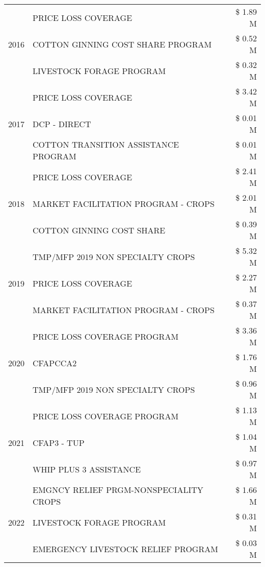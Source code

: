 \begin{tabular}{llr}
\cline{1-3}
\multirow[t]{3}{*}{2016} & PRICE LOSS COVERAGE & \$ 1.89 M \\
 & COTTON GINNING COST SHARE PROGRAM & \$ 0.52 M \\
 & LIVESTOCK FORAGE PROGRAM & \$ 0.32 M \\
\cline{1-3}
\multirow[t]{3}{*}{2017} & PRICE LOSS COVERAGE & \$ 3.42 M \\
 & DCP - DIRECT & \$ 0.01 M \\
 & COTTON TRANSITION ASSISTANCE PROGRAM & \$ 0.01 M \\
\cline{1-3}
\multirow[t]{3}{*}{2018} & PRICE LOSS COVERAGE & \$ 2.41 M \\
 & MARKET FACILITATION PROGRAM - CROPS & \$ 2.01 M \\
 & COTTON GINNING COST SHARE & \$ 0.39 M \\
\cline{1-3}
\multirow[t]{3}{*}{2019} & TMP/MFP 2019 NON SPECIALTY CROPS & \$ 5.32 M \\
 & PRICE LOSS COVERAGE & \$ 2.27 M \\
 & MARKET FACILITATION PROGRAM - CROPS & \$ 0.37 M \\
\cline{1-3}
\multirow[t]{3}{*}{2020} & PRICE LOSS COVERAGE PROGRAM & \$ 3.36 M \\
 & CFAPCCA2 & \$ 1.76 M \\
 & TMP/MFP 2019 NON SPECIALTY CROPS & \$ 0.96 M \\
\cline{1-3}
\multirow[t]{3}{*}{2021} & PRICE LOSS COVERAGE PROGRAM & \$ 1.13 M \\
 & CFAP3 - TUP & \$ 1.04 M \\
 & WHIP PLUS 3 ASSISTANCE & \$ 0.97 M \\
\cline{1-3}
\multirow[t]{3}{*}{2022} & EMGNCY RELIEF PRGM-NONSPECIALITY CROPS & \$ 1.66 M \\
 & LIVESTOCK FORAGE PROGRAM & \$ 0.31 M \\
 & EMERGENCY LIVESTOCK RELIEF PROGRAM & \$ 0.03 M \\
\cline{1-3}
\bottomrule
\end{tabular}
